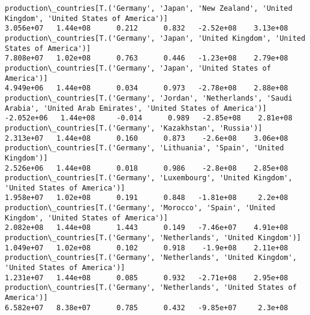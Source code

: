 \documentclass[11pt]{article}
\begin{document}
\begin{Verbatim}[commandchars=\\\{\}]
production\_countries[T.('Germany', 'Japan', 'New Zealand', 'United Kingdom', 'United States of America')]                                                                              3.056e+07   1.44e+08      0.212      0.832   -2.52e+08    3.13e+08
production\_countries[T.('Germany', 'Japan', 'United Kingdom', 'United States of America')]                                                                                             7.808e+07   1.02e+08      0.763      0.446   -1.23e+08    2.79e+08
production\_countries[T.('Germany', 'Japan', 'United States of America')]                                                                                                               4.949e+06   1.44e+08      0.034      0.973   -2.78e+08    2.88e+08
production\_countries[T.('Germany', 'Jordan', 'Netherlands', 'Saudi Arabia', 'United Arab Emirates', 'United States of America')]                                                      -2.052e+06   1.44e+08     -0.014      0.989   -2.85e+08    2.81e+08
production\_countries[T.('Germany', 'Kazakhstan', 'Russia')]                                                                                                                            2.313e+07   1.44e+08      0.160      0.873    -2.6e+08    3.06e+08
production\_countries[T.('Germany', 'Lithuania', 'Spain', 'United Kingdom')]                                                                                                            2.526e+06   1.44e+08      0.018      0.986    -2.8e+08    2.85e+08
production\_countries[T.('Germany', 'Luxembourg', 'United Kingdom', 'United States of America')]                                                                                        1.958e+07   1.02e+08      0.191      0.848   -1.81e+08     2.2e+08
production\_countries[T.('Germany', 'Morocco', 'Spain', 'United Kingdom', 'United States of America')]                                                                                  2.082e+08   1.44e+08      1.443      0.149   -7.46e+07    4.91e+08
production\_countries[T.('Germany', 'Netherlands', 'United Kingdom')]                                                                                                                   1.049e+07   1.02e+08      0.102      0.918    -1.9e+08    2.11e+08
production\_countries[T.('Germany', 'Netherlands', 'United Kingdom', 'United States of America')]                                                                                       1.231e+07   1.44e+08      0.085      0.932   -2.71e+08    2.95e+08
production\_countries[T.('Germany', 'Netherlands', 'United States of America')]                                                                                                         6.582e+07   8.38e+07      0.785      0.432   -9.85e+07     2.3e+08

\end{Verbatim}
\end{document}
